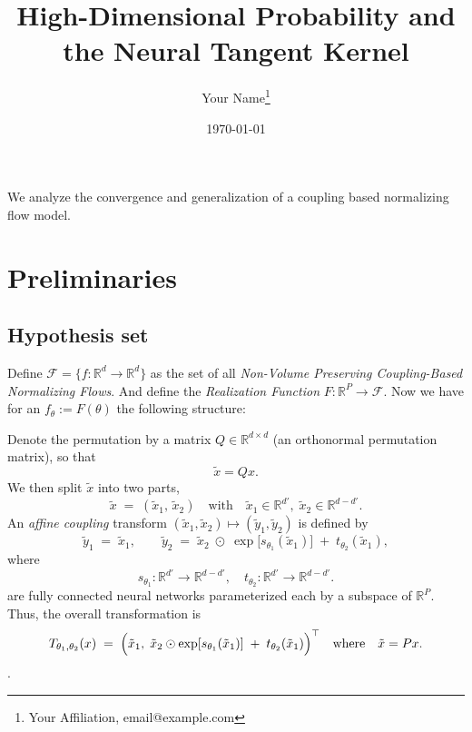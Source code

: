 \documentclass[11pt, a4paper]{article}
\title{High-Dimensional Probability and the Neural Tangent Kernel}
\author{Your Name\thanks{Your Affiliation, email@example.com}}
\date{\today}
\theoremstyle{definition}
\theoremstyle{remark}
\newcommand{\R}{\mathbb{R}}
\begin{document}
	
	\maketitle
	
	
	\begin{abstract}
		
	\end{abstract}
	
	
	We analyze the convergence and generalization of a coupling based normalizing flow model.
	
	\section{Preliminaries}
	
	\subsection{Hypothesis set}
	
	Define \(\mathcal{F} = \{f :\R^d \to \R^d\}\) as the set of all \textit{Non-Volume Preserving Coupling-Based Normalizing Flows}. And define the \textit{Realization Function} \(F:\R^P \to \mathcal{F}\). Now we have for an \(f_\theta := F(\theta)\) the following structure:
	
	Denote the permutation by a matrix $Q \in \mathbb{R}^{d \times d}$ (an orthonormal permutation matrix), 
	so that
	\[
	\tilde{x} = Q x.
	\]
	We then split $\tilde{x}$ into two parts, 
	\[
	\tilde{x} 
	\;=\; (\tilde{x}_1, \,\tilde{x}_2)
	\quad \text{with} \quad
	\tilde{x}_1 \in \mathbb{R}^{d'}, 
	\;\tilde{x}_2 \in \mathbb{R}^{d - d'}.
	\]
	An \emph{affine coupling} transform $(\tilde{x}_1, \tilde{x}_2) \mapsto (\tilde{y}_1, \tilde{y}_2)$ 
	is defined by
	\[
	\tilde{y}_1 
	\;=\; \tilde{x}_1,
	\qquad
	\tilde{y}_2 
	\;=\; \tilde{x}_2 \;\odot\; \exp\bigl[s_{\theta_1}(\tilde{x}_1)\bigr]
	\;+\; t_{\theta_2}(\tilde{x}_1),
	\]
	where 
	\[
	s_{\theta_1}: \mathbb{R}^{d'} \to \mathbb{R}^{d-d'}, 
	\quad
	t_{\theta_2}: \mathbb{R}^{d'} \to \mathbb{R}^{d-d'}.
	\]
	are fully connected neural networks parameterized each by a subspace of $\R^P$. 
	Thus, the overall transformation is 
	\[
	T_{\theta_1,\theta_2}(x) \;=\;
	\Bigl(
	\tilde{x}_1,\;
	\tilde{x}_2 \odot \exp[s_{\theta_1}(\tilde{x}_1)] \;+\; t_{\theta_2}(\tilde{x}_1)
	\Bigr)^\top
	\quad\text{where}\quad 
	\tilde{x} = P x.
	\].
	
\end{document}
